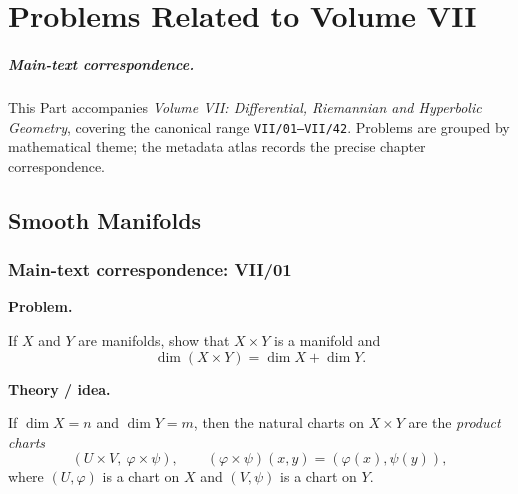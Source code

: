 
\providecommand{\DiskGeodesic}[3][]{%
  \begingroup
  \pgfmathsetmacro{\dgax}{cos(#2)}%
  \pgfmathsetmacro{\dgay}{sin(#2)}%
  \pgfmathsetmacro{\dgbx}{cos(#3)}%
  \pgfmathsetmacro{\dgby}{sin(#3)}%
  \pgfmathsetmacro{\dgdet}{\dgax*\dgby-\dgay*\dgbx}%
  \pgfmathsetmacro{\dgh}{(\dgby-\dgay)/\dgdet}%
  \pgfmathsetmacro{\dgk}{(\dgax-\dgbx)/\dgdet}%
  \pgfmathsetmacro{\dgR}{sqrt(\dgh*\dgh+\dgk*\dgk-1)}%
  \begin{scope}
    \clip (0,0) circle (1);
    \draw[#1] (\dgh,\dgk) circle (\dgR);
  \end{scope}
  \endgroup
}

\chapter{Problems Related to Volume VII}
\label{ch:companion-vii}

\paragraph{Main-text correspondence.}
This Part accompanies \emph{Volume VII: Differential, Riemannian and Hyperbolic Geometry},
covering the canonical range \texttt{VII/01--VII/42}. Problems are grouped by
mathematical theme; the metadata atlas records the precise chapter correspondence.

\section{Smooth Manifolds}

\subsection*{Main-text correspondence: VII/01}

\begin{problem}
\label{prob:cp-vii-0001}
\par\medskip\noindent\textbf{Problem.}\par\smallskip

If $X$ and $Y$ are manifolds, show that $X\times Y$ is a manifold and
\[
\dim(X\times Y)=\dim X+\dim Y.
\]

\par\medskip\noindent\textbf{Theory / idea.}\par\smallskip

If $\dim X=n$ and $\dim Y=m$, then the natural charts on $X\times Y$ are the
\emph{product charts}
\[
(U\times V,\ \varphi\times\psi),\qquad (\varphi\times\psi)(x,y)=(\varphi(x),\psi(y)),
\]
where $(U,\varphi)$ is a chart on $X$ and $(V,\psi)$ is a chart on $Y$.
\end{problem}

